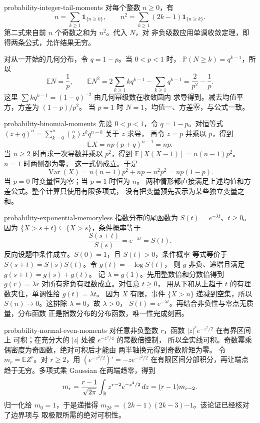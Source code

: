 \begin{solution}{probability-integer-tail-moments}
对每个整数 \(n\ge0\)，有
\[
 n=\sum_{k\ge1}\mathbf1_{\{n\ge k\}},\qquad
 n^2=\sum_{k\ge1}(2k-1)\mathbf1_{\{n\ge k\}}.
\]
第二式来自前 \(n\) 个奇数之和为 \(n^2\)。代入 \(N\)，对
非负级数应用单调收敛定理，即得两条公式，允许结果无穷。

对从一开始的几何分布，令 \(q=1-p\)。当 \(0<p<1\) 时，
\(\mathbb P(N\ge k)=q^{k-1}\)，所以
\[
 \mathbb E N=\frac1p,\qquad
 \mathbb E N^2=2\sum_{k\ge1}kq^{k-1}-\sum_{k\ge1}q^{k-1}
 =\frac2{p^2}-\frac1p.
\]
这里 \(\sum kq^{k-1}=(1-q)^{-2}\) 由几何幂级数在收敛圆内
求导得到。减去均值平方，方差为 \((1-p)/p^2\)。
当 \(p=1\) 时 \(N=1\)，均值一、方差零，与公式一致。
\end{solution}

\begin{solution}{probability-binomial-moments}
先设 \(0<p<1\)，令 \(q=1-p\)。对恒等式
\((z+q)^n=\sum_{k=0}^n\binom nk z^kq^{n-k}\) 关于 \(z\) 求导，
再令 \(z=p\) 并乘以 \(p\)，得到
\[
 \mathbb E X=np(p+q)^{n-1}=np.
\]
当 \(n\ge2\) 时再求一次导数并乘以 \(p^2\)，得到
\(\mathbb E[X(X-1)]=n(n-1)p^2\)。\(n=1\) 时两侧都为零，
这一式仍成立。于是
\[
 \operatorname{Var}(X)=n(n-1)p^2+np-n^2p^2=np(1-p).
\]
当 \(p=0\) 时变量恒为零；当 \(p=1\) 时恒为 \(n\)。
两种情形都直接满足上述均值和方差公式。整个计算只使用有限多项式，
没有把变量预先表示为某些独立变量之和。
\end{solution}

\begin{solution}{probability-exponential-memoryless}
指数分布的尾函数为 \(S(t)=e^{-\lambda t}\)、\(t\ge0\)。
因为 \(\{X>s+t\}\subseteq\{X>s\}\)，条件概率等于
\[
 \frac{S(s+t)}{S(s)}=e^{-\lambda t}=S(t).
\]
反向设题中条件成立。\(S(0)=1\)，且 \(S(t)>0\)，条件概率
等式等价于 \(S(s+t)=S(s)S(t)\)。令 \(g(t)=-\log S(t)\)，
则 \(g\) 非负、递增且满足 \(g(s+t)=g(s)+g(t)\)。
记 \(\lambda=g(1)\)。先用整数倍和分数倍得到
\(g(r)=\lambda r\) 对所有非负有理数成立。对任意 \(t\ge0\)，
用从下和从上趋于 \(t\) 的有理数夹住，单调性给
\(g(t)=\lambda t\)。
因为 \(X\) 有限，事件 \(\{X>n\}\) 递减到空集，所以
\(S(n)\to0\)。这排除 \(\lambda=0\)，故 \(\lambda>0\)，
\(S(t)=e^{-\lambda t}\)。再结合非负性与零点无质量，分布函数
正是指数分布的分布函数，唯一性完成刻画。
\end{solution}

\begin{solution}{probability-normal-even-moments}
对任意非负整数 \(r\)，函数 \(|z|^re^{-z^2/2}\) 在有界区间上
可积；在充分大的 \(|z|\) 处被 \(e^{-z^2/4}\) 的常数倍控制，
所以全实线可积。奇数幂乘偶密度为奇函数，绝对可积后才能由
两半轴换元得到奇数阶矩为零。
令 \(m_r=\mathbb E Z^r\)。对 \(r\ge2\)，用
\((e^{-z^2/2})'=-ze^{-z^2/2}\) 在有限区间分部积分，再让端点
趋于无穷。多项式乘 Gaussian 在两端趋零，得到
\[
 m_r=\frac{r-1}{\sqrt{2\pi}}\int_{\mathbb{R}} z^{r-2}e^{-z^2/2}\,dz
 =(r-1)m_{r-2}.
\]
归一化给 \(m_0=1\)，于是递推得
\(m_{2k}=(2k-1)(2k-3)\cdots1\)。该论证已经核对了边界项与
取极限所需的绝对可积性。
\end{solution}

